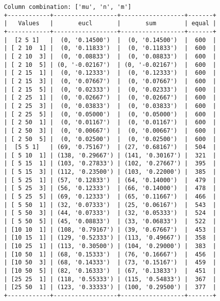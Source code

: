 \documentclass{article}
\begin{document}
\begin{verbatim}
Column combination: ['mu', 'n', 'm']
+------------+------------------+------------------+-------+
|   Values   |       eucl       |       sum        | equal |
+------------+------------------+------------------+-------+
|  [2 5 1]   |  (0, '0.14500')  |  (0, '0.14500')  |  600  |
| [ 2 10  1] |  (0, '0.11833')  |  (0, '0.11833')  |  600  |
| [ 2 10  3] |  (0, '0.08833')  |  (0, '0.08833')  |  600  |
| [ 2 10  5] | (0, '-0.02167')  | (0, '-0.02167')  |  600  |
| [ 2 15  1] |  (0, '0.12333')  |  (0, '0.12333')  |  600  |
| [ 2 15  3] |  (0, '0.07667')  |  (0, '0.07667')  |  600  |
| [ 2 15  5] |  (0, '0.02333')  |  (0, '0.02333')  |  600  |
| [ 2 25  1] |  (0, '0.02667')  |  (0, '0.02667')  |  600  |
| [ 2 25  3] |  (0, '0.03833')  |  (0, '0.03833')  |  600  |
| [ 2 25  5] |  (0, '0.05000')  |  (0, '0.05000')  |  600  |
| [ 2 50  1] |  (0, '0.01167')  |  (0, '0.01167')  |  600  |
| [ 2 50  3] |  (0, '0.00667')  |  (0, '0.00667')  |  600  |
| [ 2 50  5] |  (0, '0.02500')  |  (0, '0.02500')  |  600  |
|  [5 5 1]   | (69, '0.75167')  | (27, '0.68167')  |  504  |
| [ 5 10  1] | (138, '0.29667') | (141, '0.30167') |  321  |
| [ 5 15  1] | (103, '0.27833') | (102, '0.27667') |  395  |
| [ 5 15  3] | (112, '0.23500') | (103, '0.22000') |  385  |
| [ 5 25  1] | (57, '0.12833')  | (64, '0.14000')  |  479  |
| [ 5 25  3] | (56, '0.12333')  | (66, '0.14000')  |  478  |
| [ 5 25  5] | (69, '0.12333')  | (65, '0.11667')  |  466  |
| [ 5 50  1] | (32, '0.07333')  | (25, '0.06167')  |  543  |
| [ 5 50  3] | (44, '0.07333')  | (32, '0.05333')  |  524  |
| [ 5 50  5] | (45, '0.08833')  | (33, '0.06833')  |  522  |
| [10 10  1] | (108, '0.79167') | (39, '0.67667')  |  453  |
| [10 15  1] | (129, '0.52333') | (113, '0.49667') |  358  |
| [10 25  1] | (113, '0.30500') | (104, '0.29000') |  383  |
| [10 50  1] | (68, '0.15333')  | (76, '0.16667')  |  456  |
| [10 50  3] | (68, '0.14333')  | (73, '0.15167')  |  459  |
| [10 50  5] | (82, '0.16333')  | (67, '0.13833')  |  451  |
| [25 25  1] | (118, '0.55333') | (115, '0.54833') |  367  |
| [25 50  1] | (123, '0.33333') | (100, '0.29500') |  377  |
+------------+------------------+------------------+-------+
\end{verbatim}
\end{document}
